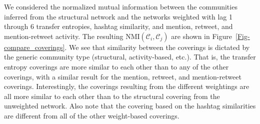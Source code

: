 We considered the normalized mutual information between the communities inferred from the structural network and the networks weighted with lag 1 through 6 transfer entropies, hashtag similarity, and mention, retweet, and mention-retweet activity. The resulting $\text{NMI}(\mathcal{C}_{i}, \mathcal{C}_{j})$ are shown in Figure~\ref{Fig-compare_coverings}. We see that similarity between the coverings is dictated by the generic community type (structural, activity-based, etc.). That is, the transfer entropy coverings are more similar to each other than to any of the other coverings, with a similar result for the mention, retweet, and mention-retweet coverings. Interestingly, the coverings resulting from the different weightings are all more similar to each other than to the structural covering from the unweighted network. Also note that the covering based on the hashtag similarities are different from all of the other weight-based coverings.

